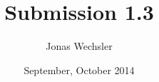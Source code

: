 \documentclass{article}
\title{Submission 1.3}
\author{Jonas Wechsler}
\date{September, October 2014}
\begin{document}
	\maketitle
	\section{}
\end{document}
